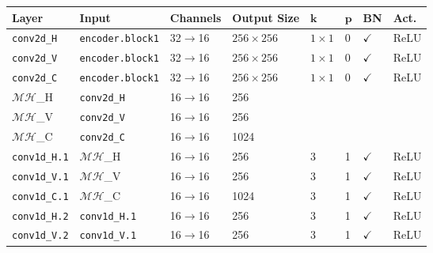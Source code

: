 \documentclass[runningheads]{llncs}
\begin{document}
\begin{table*}[!t]
\centering


\begin{tabu} to \textwidth {X[4,c]X[5,c]X[3,c]X[3,c]X[2,c]X[1,c]X[1,c]X[2,c]}
\toprule
\textbf{Layer}             & \textbf{Input}             & \textbf{Channels}          & \textbf{Output Size}     & $\mathbf{k}$ & $\mathbf{p}$ & \textbf{BN}           & \textbf{Act.} \\ \midrule
\texttt{conv2d\_H}         & \texttt{encoder.block1}    & 32$\rightarrow$16 & $256\times 256$ & $1\times1$   & 0            & $\checkmark$ & ReLU \\ \midrule
\texttt{conv2d\_V}         & \texttt{encoder.block1}    & 32$\rightarrow$16 & $256\times 256$ & $1\times1$   & 0            & $\checkmark$ & ReLU \\ \midrule
\texttt{conv2d\_C}         & \texttt{encoder.block1}    & 32$\rightarrow$16 & $256\times 256$ & $1\times1$   & 0            & $\checkmark$ & ReLU \\ \midrule
$\mathcal{MH}$\_H & \texttt{conv2d\_H}         & 16$\rightarrow$16                & 256             &              &              &              &      \\ \midrule
$\mathcal{MH}$\_V & \texttt{conv2d\_V}         & 16$\rightarrow$16                & 256             &              &              &              &      \\ \midrule
$\mathcal{MH}$\_C & \texttt{conv2d\_C}         & 16$\rightarrow$16                & 1024            &              &              &              &      \\ \midrule
\texttt{conv1d\_H.1}       & $\mathcal{MH}$\_H & 16$\rightarrow$16                & 256             & $3$          & 1            & $\checkmark$ & ReLU \\ \midrule
\texttt{conv1d\_V.1}       & $\mathcal{MH}$\_V & 16$\rightarrow$16                & 256             & $3$          & 1            & $\checkmark$ & ReLU \\ \midrule
\texttt{conv1d\_C.1}       & $\mathcal{MH}$\_C & 16$\rightarrow$16                & 1024            & $3$          & 1            & $\checkmark$ & ReLU \\ \midrule
\texttt{conv1d\_H.2}       & \texttt{conv1d\_H.1}       & 16$\rightarrow$16                & 256             & $3$          & 1            & $\checkmark$ & ReLU \\ \midrule
\texttt{conv1d\_V.2}       & \texttt{conv1d\_V.1}       & 16$\rightarrow$16                & 256             & $3$          & 1            & $\checkmark$ & ReLU \\ \midrule

\end{tabu}
\end{table*}
\end{document}
